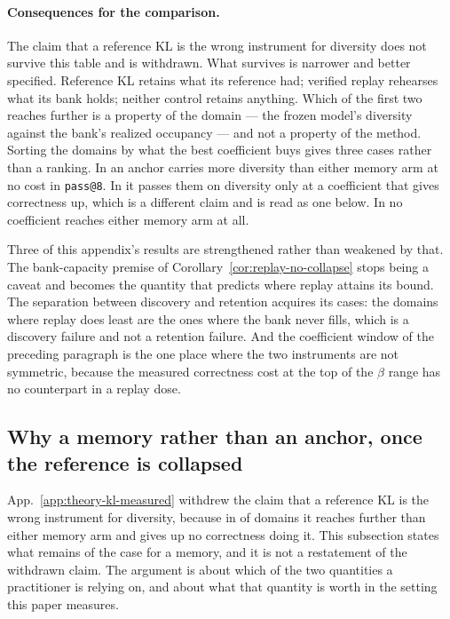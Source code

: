 \documentclass{article}
\newcommand{\1}{\mathbf 1}
\theoremstyle{remark}
\theoremstyle{definition}
\theoremstyle{plain}
\begin{document}
\paragraph{Consequences for the comparison.}
The claim that a reference KL is the wrong instrument for diversity does not
survive this table and is withdrawn. What survives is narrower and better
specified. Reference KL retains what its reference had; verified replay
rehearses what its bank holds; neither control retains anything. Which of the
first two reaches further is a property of the domain --- the frozen model's
diversity against the bank's realized occupancy --- and not a property of the
method. Sorting the domains by what the best coefficient buys gives three
cases rather than a ranking. In \MDklFreeNames{} an anchor carries more diversity than
either memory arm at no cost in \texttt{pass@8}. In \MDklPricedNames{} it
passes them on diversity only at a coefficient that gives correctness up, which
is a different claim and is read as one below. In \MDklMemoryNames{} no
coefficient reaches either memory arm at all.

Three of this appendix's results are strengthened rather than weakened by that.
The bank-capacity premise of Corollary~\ref{cor:replay-no-collapse} stops being
a caveat and becomes the quantity that predicts where replay attains its bound.
The separation between discovery and retention acquires its cases: the domains
where replay does least are the ones where the bank never fills, which is a
discovery failure and not a retention failure. And the coefficient window of
the preceding paragraph is the one place where the two instruments are not
symmetric, because the measured correctness cost at the top of the $\beta$
range has no counterpart in a replay dose.

\subsection{Why a memory rather than an anchor, once the reference is collapsed}
\label{app:theory-kl-case}

App.~\ref{app:theory-kl-measured} withdrew the claim that a reference KL is the
wrong instrument for diversity, because in \MDklFreeDomains{} of \MDklDomains{}
domains it reaches further than either memory arm and gives up no correctness
doing it. This subsection states what remains of the
case for a memory, and it is not a restatement of the withdrawn claim. The
argument is about which of the two quantities a practitioner is relying on, and
about what that quantity is worth in the setting this paper measures.
\end{document}
